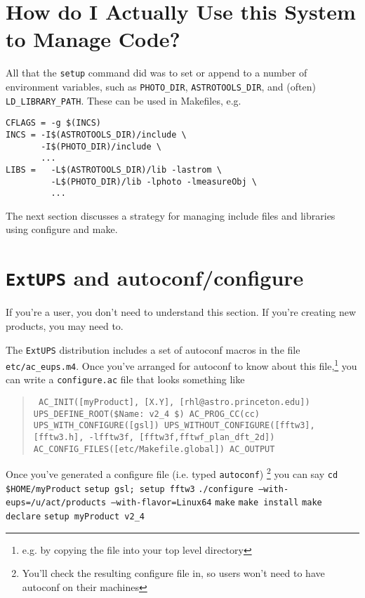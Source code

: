 \documentclass{article}
\newcommand{\code}[1]{\texttt{#1}}
\newcommand{\file}[1]{\texttt{#1}}
\newcommand{\eups}{\code{ExtUPS}}
\begin{document}
\section{How do I Actually Use this System to Manage Code?}

All that the \code{setup} command did was to set or append to a number of environment variables,
such as \code{PHOTO\_DIR}, \code{ASTROTOOLS\_DIR}, and (often) \code{LD\_LIBRARY\_PATH}.
These can be used in Makefiles, e.g.
\begin{verbatim}
CFLAGS = -g $(INCS)
INCS = -I$(ASTROTOOLS_DIR)/include \
       -I$(PHOTO_DIR)/include \
       ...
LIBS =   -L$(ASTROTOOLS_DIR)/lib -lastrom \
         -L$(PHOTO_DIR)/lib -lphoto -lmeasureObj \
         ...
\end{verbatim} %

The next section discusses a strategy for managing include files
and libraries using configure and make.

\section{\eups{} and autoconf/configure}

If you're a user, you don't need to understand this section. If
you're creating new products, you may need to.

The \eups{} distribution includes a set of autoconf macros
in the file \file{etc/ac\_eups.m4}. Once you've arranged for
autoconf to know about this file,\footnote{e.g. by copying the
  file into your top level directory} you can write a
\file{configure.ac} file that looks something like
\begin{quote}
\obeylines\tt\small\parskip=0pt
AC\_INIT([myProduct], [X.Y], [rhl@astro.princeton.edu])
UPS\_DEFINE\_ROOT(\${Name}: v2\_4 \$)
AC\_PROG\_CC(cc)
UPS\_WITH\_CONFIGURE([gsl])
UPS\_WITHOUT\_CONFIGURE([fftw3], [fftw3.h], -lfftw3f, [fftw3f,fftwf\_plan\_dft\_2d])
AC\_CONFIG\_FILES([etc/Makefile.global])
AC\_OUTPUT
\end{quote}

Once you've generated a configure file (i.e. typed \code{autoconf})%
\footnote{You'll check the resulting configure file in, so users won't
  need to have autoconf on their machines}
you can say\hfil\break
\code{cd \$HOME/myProduct}\hfil\break
\code{setup gsl; setup fftw3}\hfil\break
\code{./configure --with-eups=/u/act/products --with-flavor=Linux64}\hfil\break
\code{make}\hfil\break
\code{make install}\hfil\break
\code{make declare}\hfil\break
\code{setup myProduct v2\_4}\hfil\break
\end{document}
